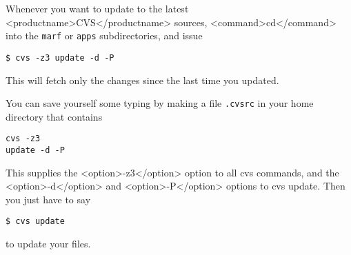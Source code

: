 \item
     Whenever you want to update to the latest <productname>CVS</productname> sources,
     <command>cd</command> into
     the \verb+marf+ or \verb+apps+ subdirectories, and issue
\begin{verbatim}
$ cvs -z3 update -d -P
\end{verbatim}

     This will fetch only the changes since the last time you updated.

\item
     You can save yourself some typing by making a file \verb+.cvsrc+
     in your home directory that contains

\begin{verbatim}
cvs -z3
update -d -P
\end{verbatim}

     This supplies the <option>-z3</option> option to all cvs commands, and the
     <option>-d</option> and <option>-P</option> options to cvs update.  Then you just have
     to say
\begin{verbatim}
$ cvs update
\end{verbatim}

     to update your files.
